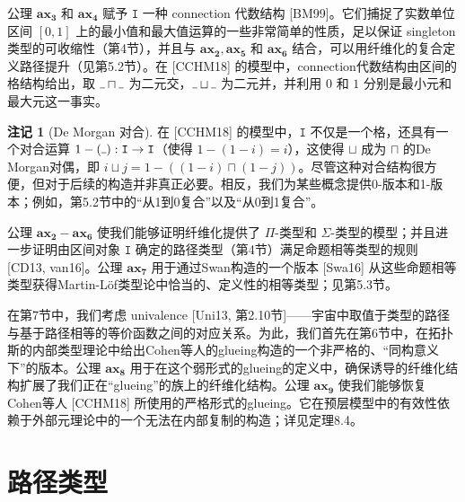 \documentclass{ctexart}
\theoremstyle{plain}
\theoremstyle{definition}
\theoremstyle{definition}
\theoremstyle{definition}
\newtheorem{remark}[theorem]{注记}
\theoremstyle{definition}
\newcommand\ttI{\mathtt{I}}
\newcommand{\ax}[1]{\mathbf{ax_{#1}}}
\newcommand{\ul}{{\rule[0ex]{0.4em}{0.4pt}}} %
\numberwithin{equation}{section}
\begin{document}
公理 $\ax{3}$ 和 $\ax{4}$ 赋予 $\ttI$ 一种 connection 代数结构 [BM99]。它们捕捉了实数单位区间 $[0, 1]$ 上的最小值和最大值运算的一些非常简单的性质，足以保证 singleton 类型的可收缩性（第4节），并且与 $\ax{2}, \ax{5}$ 和 $\ax{6}$ 结合，可以用纤维化的复合定义路径提升（见第5.2节）。在 [CCHM18] 的模型中，connection代数结构由区间的格结构给出，取 $\ul\sqcap\ul$ 为二元交，$\ul\sqcup\ul$ 为二元并，并利用 $0$ 和 $1$ 分别是最小元和最大元这一事实。

\begin{remark}[De Morgan 对合]
  在 [CCHM18] 的模型中，$\ttI$ 不仅是一个格，还具有一个对合运算 $1 - (\ul) : \ttI \to \ttI$（使得 $1 - (1 - i) = i$），这使得 $\sqcup$ 成为 $\sqcap$ 的De Morgan对偶，即 $i \sqcup j = 1 - ((1 - i) \sqcap (1 - j))$。尽管这种对合结构很方便，但对于后续的构造并非真正必要。相反，我们为某些概念提供0-版本和1-版本；例如，第5.2节中的“从1到0复合”以及“从0到1复合”。
\end{remark}

公理 $\ax{2}-\ax{6}$ 使我们能够证明纤维化提供了 $\Pi$-类型和 $\Sigma$-类型的模型；并且进一步证明由区间对象 $\ttI$ 确定的路径类型（第4节）满足命题相等类型的规则 [CD13, van16]。公理 $\ax{7}$ 用于通过Swan构造的一个版本 [Swa16] 从这些命题相等类型获得Martin-L\"of类型论中恰当的、定义性的相等类型；见第5.3节。

在第7节中，我们考虑 univalence [Uni13, 第2.10节]——宇宙中取值于类型的路径与基于路径相等的等价函数之间的对应关系。为此，我们首先在第6节中，在拓扑斯的内部类型理论中给出Cohen等人的glueing构造的一个非严格的、“同构意义下”的版本。公理 $\ax{8}$ 用于在这个弱形式的glueing的定义中，确保诱导的纤维化结构扩展了我们正在“glueing”的族上的纤维化结构。公理 $\ax{9}$ 使我们能够恢复Cohen等人 [CCHM18] 所使用的严格形式的glueing。它在预层模型中的有效性依赖于外部元理论中的一个无法在内部复制的构造；详见定理8.4。

\section{路径类型}
\end{document}
